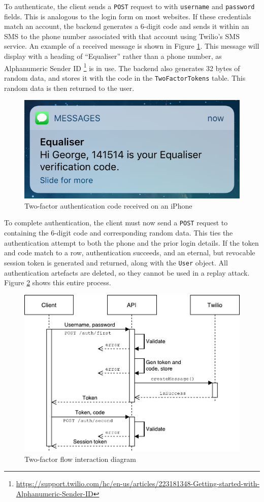 \documentclass[12pt,a4paper]{bhamdissertation}
\newcommand{\code}[1]{\texttt{#1}}
\begin{document}
To authenticate, the client sends a \code{POST} request to \code{} with \code{username} and \code{password} fields. This is analogous to the login form on most websites. If these credentials match an account, the backend generates a 6-digit code and sends it within an SMS to the phone number associated with that account using Twilio's SMS service. An example of a received message is shown in Figure \ref{img:2fa_code}. This message will display with a heading of ``Equaliser'' rather than a phone number, as Alphanumeric Sender ID \footnote{\url{https://support.twilio.com/hc/en-us/articles/223181348-Getting-started-with-Alphanumeric-Sender-ID}} is in use. The backend also generates 32 bytes of random data, and stores it with the code in the \code{TwoFactorTokens} table. This random data is then returned to the user.

\begin{figure}[!htbp]
    \centering
    \includegraphics[width=.6\linewidth]{img/2fa_code.png}
    \caption{Two-factor authentication code received on an iPhone}
    \label{img:2fa_code}
\end{figure}

To complete authentication, the client must now send a \code{POST} request to \code{} containing the 6-digit code and corresponding random data. This ties the authentication attempt to both the phone and the prior login details. If the token and code match to a row, authentication succeeds, and an eternal, but revocable session token is generated and returned, along with the \code{User} object. All authentication artefacts are deleted, so they cannot be used in a replay attack. Figure \ref{img:2fa_interaction} shows this entire process.

\begin{figure}[!htbp]
    \centering
    \includegraphics[width=.8\linewidth]{img/2fa_interaction.pdf}
    \caption{Two-factor flow interaction diagram}
    \label{img:2fa_interaction}
\end{figure}
\end{document}
